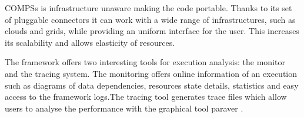 COMPSs is infrastructure unaware making the code portable. Thanks to its set of pluggable connectors it can work with a wide range of infrastructures, such as clouds\cite{lezzi2012enabling} and grids, while providing an uniform interface for the user. This increases its scalability and allows elasticity of resources.

The framework offers two interesting tools for execution analysis: the monitor and the tracing system. The monitoring offers online information of an execution such as diagrams of data dependencies, resources state details, statistics and easy access to the framework logs.The tracing tool generates trace files which allow users to analyse the performance with the graphical tool paraver \cite{Pillet1991}.

